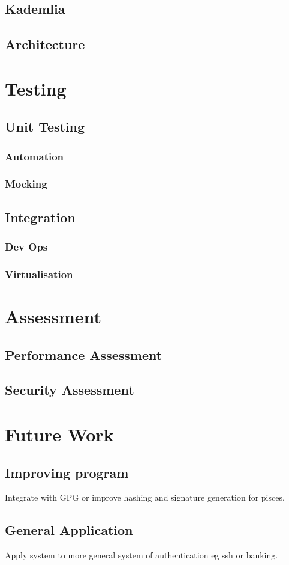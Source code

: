 \documentclass[12pt, a4paper]{article}
\begin{document}
\subsection{Kademlia}
\subsection{Architecture}
\section{Testing}
\subsection{Unit Testing}
\subsubsection{Automation}
\subsubsection{Mocking}
\subsection{Integration}
\subsubsection{Dev Ops}
\subsubsection{Virtualisation}
\section{Assessment}
\subsection{Performance Assessment}
\subsection{Security Assessment}
\section{Future Work}
\subsection{Improving program}
Integrate with GPG or improve hashing and signature generation for pisces.
\subsection{General Application}
Apply system to more general system of authentication eg ssh or banking.
\end{document}
